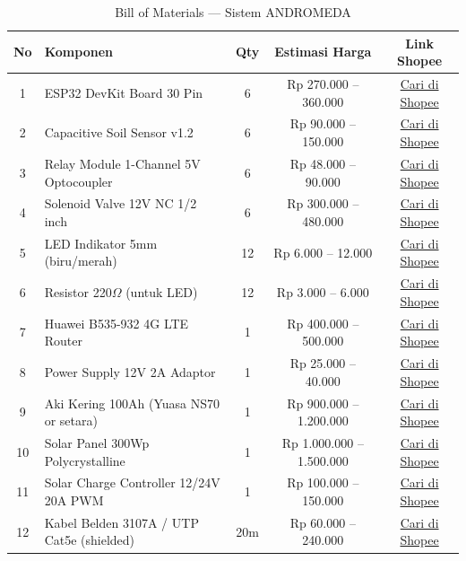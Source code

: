 \documentclass[12pt,a4paper,oneside]{report}
\begin{document}
\begin{table}[H]
\centering
\caption{Bill of Materials — Sistem ANDROMEDA}
\label{tab:bom}
\begin{tabularx}{\textwidth}{c X c c c}
\toprule
\textbf{No} & \textbf{Komponen} & \textbf{Qty} & \textbf{Estimasi Harga} & \textbf{Link Shopee} \\
\midrule
1 & ESP32 DevKit Board 30 Pin & 6 & Rp 270.000 -- 360.000 & \href{https://shopee.co.id/search?keyword=ESP32+DevKit+Board+30+pin}{Cari di Shopee} \\
2 & Capacitive Soil Sensor v1.2 & 6 & Rp 90.000 -- 150.000 & \href{https://shopee.co.id/search?keyword=capacitive+soil+sensor+arduino}{Cari di Shopee} \\
3 & Relay Module 1-Channel 5V Optocoupler & 6 & Rp 48.000 -- 90.000 & \href{https://shopee.co.id/search?keyword=relay+1+channel+5V+optocoupler}{Cari di Shopee} \\
4 & Solenoid Valve 12V NC 1/2 inch & 6 & Rp 300.000 -- 480.000 & \href{https://shopee.co.id/search?keyword=solenoid+valve+12V+NC+1+2+inch+air}{Cari di Shopee} \\
5 & LED Indikator 5mm (biru/merah) & 12 & Rp 6.000 -- 12.000 & \href{https://shopee.co.id/search?keyword=LED+5mm+indikator+merah+biru}{Cari di Shopee} \\
6 & Resistor 220$\Omega$ (untuk LED) & 12 & Rp 3.000 -- 6.000 & \href{https://shopee.co.id/search?keyword=resistor+220+ohm}{Cari di Shopee} \\
7 & Huawei B535-932 4G LTE Router & 1 & Rp 400.000 -- 500.000 & \href{https://shopee.co.id/search?keyword=Huawei+B535+router+4G+LTE}{Cari di Shopee} \\
8 & Power Supply 12V 2A Adaptor & 1 & Rp 25.000 -- 40.000 & \href{https://shopee.co.id/search?keyword=power+supply+12V+2A+adaptor}{Cari di Shopee} \\
9 & Aki Kering 100Ah (Yuasa NS70 or setara) & 1 & Rp 900.000 -- 1.200.000 & \href{https://shopee.co.id/search?keyword=aki+kering+100Ah+NS70}{Cari di Shopee} \\
10 & Solar Panel 300Wp Polycrystalline & 1 & Rp 1.000.000 -- 1.500.000 & \href{https://shopee.co.id/search?keyword=solar+panel+300wp+polycrystalline}{Cari di Shopee} \\
11 & Solar Charge Controller 12/24V 20A PWM & 1 & Rp 100.000 -- 150.000 & \href{https://shopee.co.id/search?keyword=solar+charge+controller+20A+PWM}{Cari di Shopee} \\
12 & Kabel Belden 3107A / UTP Cat5e (shielded) & 20m & Rp 60.000 -- 240.000 & \href{https://shopee.co.id/search?keyword=Belden+3107A+kabel+shielded}{Cari di Shopee} \\

\end{tabularx}
\end{table}
\end{document}
